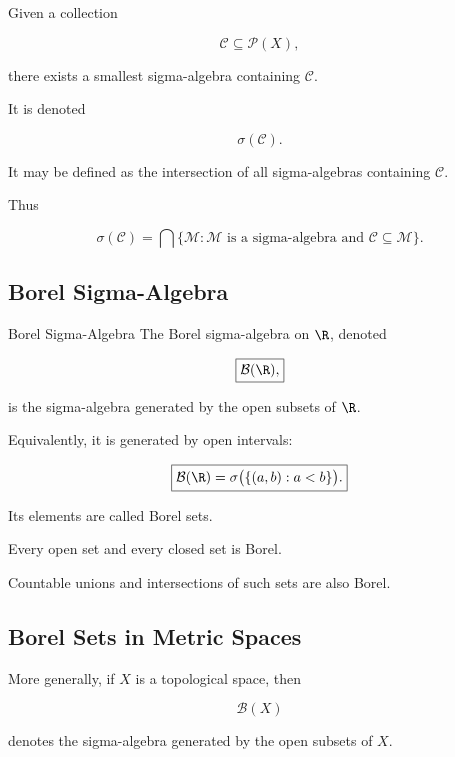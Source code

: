 Given a collection

\[
\mathcal{C}\subseteq\mathcal{P}(X),
\]

there exists a smallest sigma-algebra containing \(\mathcal{C}\).

It is denoted

\[
\boxed{
\sigma(\mathcal{C}).
}
\]

It may be defined as the intersection of all sigma-algebras containing
\(\mathcal{C}\).

Thus

\[
\boxed{
\sigma(\mathcal{C})
=
\bigcap
\{
\mathcal{M}:
\mathcal{M}\text{ is a sigma-algebra and }
\mathcal{C}\subseteq\mathcal{M}
\}.
}
\]

\subsection{Borel Sigma-Algebra}
\label{subsec:borel-sigma-algebra}

\begin{definitionbox}{Borel Sigma-Algebra}
The Borel sigma-algebra on \(\R\), denoted

\[
\boxed{
\mathcal{B}(\R),
}
\]

is the sigma-algebra generated by the open subsets of \(\R\).
\end{definitionbox}

Equivalently, it is generated by open intervals:

\[
\boxed{
\mathcal{B}(\R)
=
\sigma\bigl(
\{(a,b):a<b\}
\bigr).
}
\]

Its elements are called Borel sets.

Every open set and every closed set is Borel.

Countable unions and intersections of such sets are also Borel.

\subsection{Borel Sets in Metric Spaces}
\label{subsec:borel-metric-spaces}

More generally, if \(X\) is a topological space, then

\[
\boxed{
\mathcal{B}(X)
}
\]

denotes the sigma-algebra generated by the open subsets of \(X\).

